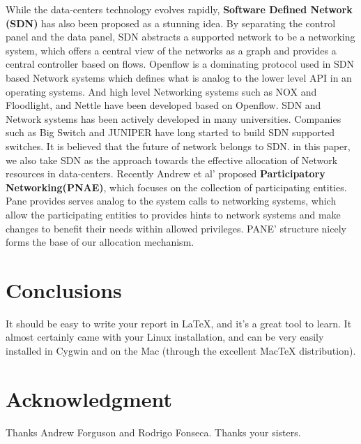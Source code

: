 \documentclass[a4paper,11pt,twocolumn]{article}
\begin{document}
While the data-centers technology evolves rapidly, \textbf{Software Defined Network (SDN)} has also been proposed as a
stunning idea. By separating the control panel and the data panel, SDN   abstracts a supported network to be a networking system, which
offers a central view of the networks as a graph and provides a central controller based on flows.
Openflow is a dominating protocol used in SDN based Network systems which defines what is analog to the lower level API in an operating systems.
And high level Networking systems  such as NOX\cite{nox} and Floodlight\cite{floodlight}, and Nettle\cite{nettle} have been developed based on Openflow. SDN and
Network systems has been actively developed in many universities. Companies such as Big Switch and JUNIPER have long 
started to build SDN supported switches. It is believed that the future of network belongs to SDN. in this paper, we also take SDN as the approach towards the effective allocation of Network resources in data-centers. Recently Andrew et al' proposed 	\textbf{Participatory Networking(PNAE)}\cite{andrew}, 
which focuses on the collection of participating entities.  Pane provides serves    analog to the system calls to networking systems, which 
allow the  participating entities to provides hints to network systems and make changes to benefit their needs within allowed privileges.
PANE' structure  nicely forms the base of our allocation mechanism. 

\section{Conclusions}

It should be easy to write your report in LaTeX, and it's a great tool
to learn. It almost certainly came with your Linux installation, and
can be very easily installed in Cygwin and on the Mac (through the
excellent MacTeX distribution).


\section{Acknowledgment}
Thanks Andrew Forguson and Rodrigo Fonseca. Thanks your sisters.


\end{document}
